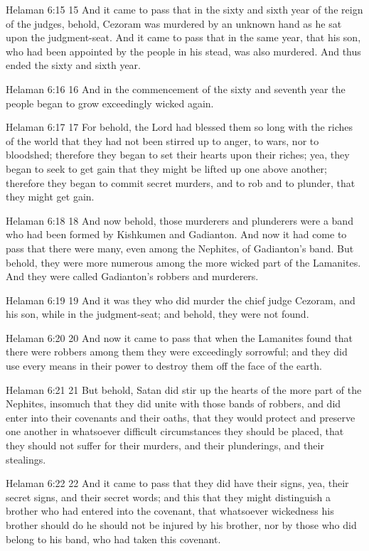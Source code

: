 Helaman 6:15
 15 And it came to pass that in the sixty and sixth year of the
reign of the judges, behold, Cezoram was murdered by an unknown
hand as he sat upon the judgment-seat. And it came to pass that
in the same year, that his son, who had been appointed by the
people in his stead, was also murdered. And thus ended the sixty
and sixth year.

Helaman 6:16
 16 And in the commencement of the sixty and seventh year the
people began to grow exceedingly wicked again.

Helaman 6:17
 17 For behold, the Lord had blessed them so long with the riches
of the world that they had not been stirred up to anger, to wars,
nor to bloodshed; therefore they began to set their hearts upon
their riches; yea, they began to seek to get gain that they might
be lifted up one above another; therefore they began to commit
secret murders, and to rob and to plunder, that they might get
gain.

Helaman 6:18
 18 And now behold, those murderers and plunderers were a band
who had been formed by Kishkumen and Gadianton. And now it had
come to pass that there were many, even among the Nephites, of
Gadianton's band. But behold, they were more numerous among the
more wicked part of the Lamanites. And they were called
Gadianton's robbers and murderers.

Helaman 6:19
 19 And it was they who did murder the chief judge Cezoram, and
his son, while in the judgment-seat; and behold, they were not
found.

Helaman 6:20
 20 And now it came to pass that when the Lamanites found that
there were robbers among them they were exceedingly sorrowful;
and they did use every means in their power to destroy them off
the face of the earth.

Helaman 6:21
 21 But behold, Satan did stir up the hearts of the more part of
the Nephites, insomuch that they did unite with those bands of
robbers, and did enter into their covenants and their oaths, that
they would protect and preserve one another in whatsoever
difficult circumstances they should be placed, that they should
not suffer for their murders, and their plunderings, and their
stealings.

Helaman 6:22
 22 And it came to pass that they did have their signs, yea,
their secret signs, and their secret words; and this that they
might distinguish a brother who had entered into the covenant,
that whatsoever wickedness his brother should do he should not be
injured by his brother, nor by those who did belong to his band,
who had taken this covenant.

